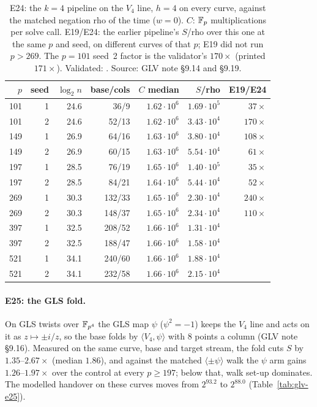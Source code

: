 \begin{table}[t]
\centering\small
\begin{tabular}{@{}rrrrrrr@{}}
\toprule
$p$ & seed & $\log_2n$ & base/cols & $C$ median & $S$/rho & E19/E24 \\
\midrule
101 & 1 & 24.6 & 36/9 & $1.62\cdot10^6$ & $1.69\cdot10^5$ & $37\times$ \\
101 & 2 & 24.6 & 52/13 & $1.62\cdot10^6$ & $3.43\cdot10^4$ & $170\times$ \\
149 & 1 & 26.9 & 64/16 & $1.63\cdot10^6$ & $3.80\cdot10^4$ & $108\times$ \\
149 & 2 & 26.9 & 60/15 & $1.63\cdot10^6$ & $5.54\cdot10^4$ & $61\times$ \\
197 & 1 & 28.5 & 76/19 & $1.65\cdot10^6$ & $1.40\cdot10^5$ & $35\times$ \\
197 & 2 & 28.5 & 84/21 & $1.64\cdot10^6$ & $5.44\cdot10^4$ & $52\times$ \\
269 & 1 & 30.3 & 132/33 & $1.65\cdot10^6$ & $2.30\cdot10^4$ & $240\times$ \\
269 & 2 & 30.3 & 148/37 & $1.65\cdot10^6$ & $2.34\cdot10^4$ & $110\times$ \\
397 & 1 & 32.5 & 208/52 & $1.66\cdot10^6$ & $1.31\cdot10^4$ & \\
397 & 2 & 32.5 & 188/47 & $1.66\cdot10^6$ & $1.58\cdot10^4$ & \\
521 & 1 & 34.1 & 240/60 & $1.66\cdot10^6$ & $1.88\cdot10^4$ & \\
521 & 2 & 34.1 & 232/58 & $1.66\cdot10^6$ & $2.15\cdot10^4$ & \\
\bottomrule
\end{tabular}
\caption[]{E24: the $k=4$ pipeline on the $V_4$ line, $h=4$ on every curve,
against the matched negation rho of the time ($w=0$). $C$: $\mathbb{F}_p$
multiplications per solve call. E19/E24: the earlier pipeline's $S$/rho over
this one at the same $p$ and seed, on different curves of that $p$; E19 did
not run $p>269$. The $p=101$ seed~2 factor is the validator's $170\times$
(printed $171\times$). Validated: .
Source: GLV note \S9.14 and \S9.19.}
\label{tab:glv-e24}
\end{table}

\paragraph{E25: the GLS fold.} On GLS twists over $\mathbb{F}_{p^4}$ the GLS map
$\psi$ ($\psi^2=-1$) keeps the $V_4$ line and acts on it as $z\mapsto\pm i/z$, so
the base folds by $\langle V_4,\psi\rangle$ with 8 points a column (GLV note
\S9.16). Measured on the same curve, base and target stream, the fold cuts
$S$ by $1.35$--$2.67\times$ (median $1.86$), and against the matched
$\langle\pm\psi\rangle$ walk the $\psi$ arm gains $1.26$--$1.97\times$ over the
control at every $p\ge197$; below that, walk set-up dominates. The modelled
handover on these curves moves from $2^{93.2}$ to $2^{88.0}$
(Table~\ref{tab:glv-e25}).


